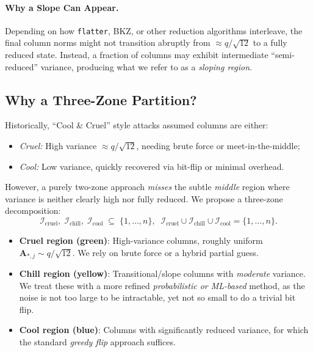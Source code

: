 \documentclass[11pt]{article}
\begin{document}

\paragraph{Why a Slope Can Appear.}
Depending on how \texttt{flatter}, BKZ, or other reduction algorithms interleave, the final column norms might not transition abruptly from $\approx q/\sqrt{12}$ to a fully reduced state. Instead, a fraction of columns may exhibit intermediate ``semi-reduced'' variance, producing what we refer to as a \emph{sloping region}.


\subsection{Why a Three-Zone Partition?}
\label{subsec:3zone}

Historically, ``Cool \& Cruel'' style attacks assumed columns are either:
\begin{itemize}
    \item \emph{Cruel:} High variance $\approx q/\sqrt{12}$, needing brute force or meet-in-the-middle;
    \item \emph{Cool:} Low variance, quickly recovered via bit-flip or minimal overhead.
\end{itemize}
However, a purely two-zone approach \emph{misses} the subtle \emph{middle} region where variance is neither clearly high nor fully reduced. We propose a three-zone decomposition:
\[
  \mathcal{I}_{\mathrm{cruel}},\;
  \mathcal{I}_{\mathrm{chill}},\;
  \mathcal{I}_{\mathrm{cool}}
  \;\subseteq\;\{1,\ldots,n\}, 
  \;\;
  \mathcal{I}_{\mathrm{cruel}}\cup\mathcal{I}_{\mathrm{chill}}\cup\mathcal{I}_{\mathrm{cool}}=\{1,\ldots,n\}.
\]

\begin{itemize}
  \item \textbf{Cruel region (green)}: 
  High-variance columns, roughly uniform $\mathbf{A}_{*,j} \sim q/\sqrt{12}$. 
  We rely on brute force or a hybrid partial guess.
  \item \textbf{Chill region (yellow)}: 
  Transitional/slope columns with \emph{moderate} variance. 
  We treat these with a more refined \emph{probabilistic or ML-based} method, as the noise is not too large to be intractable, yet not so small to do a trivial bit flip.
  \item \textbf{Cool region (blue)}: 
  Columns with significantly reduced variance, for which the standard \emph{greedy flip} approach suffices.
\end{itemize}
\end{document}
